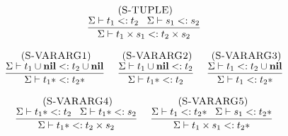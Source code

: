 \[
\begin{array}{c}
\begin{array}{c}
\; (\textsc{S-TUPLE})\\
\dfrac{\Sigma \vdash t_{1} <: t_{2} \;\;\;
       \Sigma \vdash s_{1} <: s_{2}}
      {\Sigma \vdash t_{1} \times s_{1} <: t_{2} \times s_{2}}
\end{array}
\\ \\
\begin{array}{c}
\; (\textsc{S-VARARG1})\\
\dfrac{\Sigma \vdash t_{1} \cup \mathbf{nil} <: t_{2} \cup \mathbf{nil}}
      {\Sigma \vdash t_{1}{*} <: t_{2}{*}}
\end{array}
\;
\begin{array}{c}
\; (\textsc{S-VARARG2})\\
\dfrac{\Sigma \vdash t_{1} \cup \mathbf{nil} <: t_{2}}
      {\Sigma \vdash t_{1}{*} <: t_{2}}
\end{array}
\;
\begin{array}{c}
\; (\textsc{S-VARARG3})\\
\dfrac{\Sigma \vdash t_{1} <: t_{2} \cup \mathbf{nil}}
      {\Sigma \vdash t_{1} <: t_{2}{*}}
\end{array}
\\ \\
\begin{array}{c}
\; (\textsc{S-VARARG4})\\
\dfrac{\Sigma \vdash t_{1}{*} <: t_{2} \;\;\;
       \Sigma \vdash t_{1}{*} <: s_{2}}
      {\Sigma \vdash t_{1}{*} <: t_{2} \times s_{2}}
\end{array}
\;
\begin{array}{c}
\; (\textsc{S-VARARG5})\\
\dfrac{\Sigma \vdash t_{1} <: t_{2}{*} \;\;\;
       \Sigma \vdash s_{1} <: t_{2}{*}}
      {\Sigma \vdash t_{1} \times s_{1} <: t_{2}{*}}
\end{array}
\end{array}
\]

